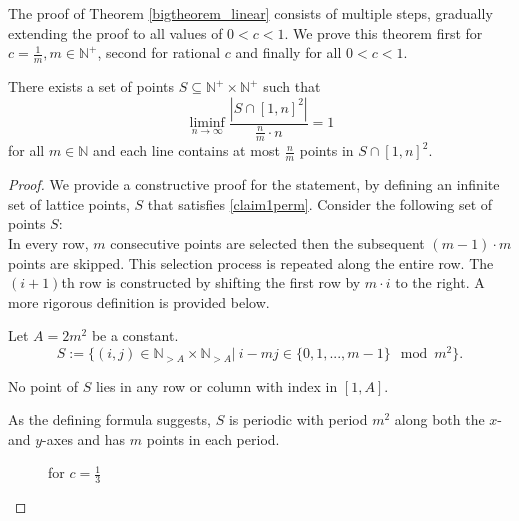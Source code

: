 \documentclass[11pt,a4paper]{article}
\numberwithin{equation}{section}
\newcommand{\nn}{\mathbb{N}}
\begin{document}
The proof of Theorem \ref{bigtheorem_linear} consists of multiple steps, gradually extending the proof to all values of $0<c<1$. We prove this theorem first for $c=\frac{1}{m}, m\in \mathbb{N}^+$, second for rational $c$ and finally for all $0<c<1$.
\begin{claim}\label{claim1perm}
   There exists a set of points $S\subseteq\nn^+\times \nn^+$ such that
    $$\displaystyle\liminf_{n\to\infty} \frac{|S\cap [1,n]^2|}{\frac{n}{m}\cdot n} = 1$$
    for all $m\in\nn$ and each line contains at most $\frac{n}{m}$ points in $S\cap [1,n]^2$.
\end{claim}
\begin{proof}
We provide a constructive proof for the statement, by defining an infinite set of lattice points, $S$ that satisfies \cref{claim1perm}. Consider the following set of points $S$: \\
In every row, $m$ consecutive points are selected then the subsequent $(m-1)\cdot m$ points are skipped. 
This selection process is repeated along the entire row. The $(i+1)$th row is constructed by shifting the first row by $m\cdot i$ to the right. A more rigorous definition is provided below.
\begin{definition}
Let $A=2m^2$ be a constant.
$$S:=\{(i, j)\in \nn_{>A}\times \nn_{>A} | \    i-mj \in \{0, 1, ..., m-1\} \mod m^2\}.$$
\end{definition}
\begin{note}
    No point of $S$ lies in any row or column with index in $[1,A]$.
\end{note}
\begin{note}
    As the defining formula suggests, $S$ is periodic with period $m^2$ along both the $x$- and $y$-axes and has $m$ points in each period.
\end{note} \noindent


    
    \begin{figure}
    \centering
    \caption{for $c = \frac13$}
    \end{figure}
    

\end{proof}
\end{document}
